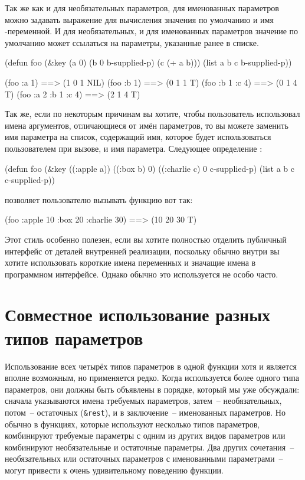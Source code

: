Так же как и для необязательных параметров, для именованных параметров можно задавать
выражение для вычисления значения по умолчанию и имя -переменной.  И для
необязательных, и для именованных параметров значение по умолчанию может ссылаться на
параметры, указанные ранее в списке.

\begin{myverb}
  (defun foo (&key (a 0) (b 0 b-supplied-p) (c (+ a b)))
    (list a b c b-supplied-p))
\end{myverb}
  
\begin{myverb}
  (foo :a 1)           ==> (1 0 1 NIL)
  (foo :b 1)           ==> (0 1 1 T)
  (foo :b 1 :c 4)      ==> (0 1 4 T)
  (foo :a 2 :b 1 :c 4) ==> (2 1 4 T)
\end{myverb}

Так же, если по некоторым причинам вы хотите, чтобы пользователь использовал имена
аргументов, отличающиеся от имён параметров, то вы можете заменить имя параметра на
список, содержащий имя, которое будет использоваться пользователем при вызове, и имя
параметра.  Следующее определение :

\begin{myverb}
  (defun foo (&key ((:apple a)) ((:box b) 0) ((:charlie c) 0 c-supplied-p)
    (list a b c c-supplied-p))
\end{myverb}

\noindent{}позволяет пользователю вызывать функцию вот так:

\begin{myverb}
  (foo :apple 10 :box 20 :charlie 30) ==> (10 20 30 T)
\end{myverb}

Этот стиль особенно полезен, если вы хотите полностью отделить публичный интерфейс от
деталей внутренней реализации, поскольку обычно внутри вы хотите использовать короткие
имена переменных и значащие имена в программном интерфейсе.  Однако обычно это
используется не особо часто.

\section{Совместное использование разных типов параметров}

Использование всех четырёх типов параметров в одной функции хотя и является вполне
возможным, но применяется редко.  Когда используется более одного типа параметров, они
должны быть объявлены в порядке, который мы уже обсуждали: сначала указываются имена
требуемых параметров, затем~-- необязательных, потом~-- остаточных (\lstinline!&rest!), и в
заключение~-- именованных параметров.  Но обычно в функциях, которые используют несколько
типов параметров, комбинируют требуемые параметры с одним из других видов параметров или
комбинируют необязательные и остаточные параметры.  Два других сочетания~--
необязательных или остаточных параметров с именованными параметрами~-- могут привести к
очень удивительному поведению функции.

